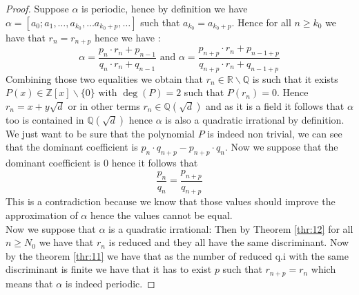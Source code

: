 \documentclass[a4paper,11pt,american]{article}
\newcommand{\Q}{\mathbb{Q}}
\newcommand{\R}{\mathbb{R}}
\newcommand{\Z}{\mathbb{Z}}
\theoremstyle{plain}
\theoremstyle{definition}
\begin{document}
     \begin{proof}
         Suppose $\alpha$ is periodic, hence by definition we have $\alpha=[a_0;a_1,\dots, a_{k_0},\dots a_{k_0+p},\dots]$ such that $a_{k_0}=a_{k_0+p}$. Hence for all $n\geq k_0$ we have that $r_n=r_{n+p}$ hence we have :
         \begin{equation*}
             \alpha=\frac{p_n\cdot r_n+p_{n-1}}{q_n\cdot r_n+q_{n-1}} \text{ and } \alpha =\frac{p_{n+p}\cdot r_n+p_{n-1+p}}{q_{n+p}\cdot r_n+q_{n-1+p}} 
         \end{equation*}
         Combining those two equalities we obtain that $r_n\in\R\backslash\Q$ is such that it exists $P(x)\in\Z[x]\backslash\{0\}$ with $\deg(P)=2$ such that $P(r_n)=0$. Hence $r_n=x+y\sqrt{d}$ or in other terms $r_n\in\Q(\sqrt{d})$ and as it is a field it follows that $\alpha$ too is contained in $\Q(\sqrt{d})$ hence $\alpha$ is also a quadratic irrational by definition.
         We just want to be sure that the polynomial $P$ is indeed non trivial, we can see that the dominant coefficient is $p_{n}\cdot q_{n+p}-p_{n+p}\cdot q_{n}$. Now we suppose that the dominant coefficient is 0 hence it follows that $$\frac{p_n}{q_n}=\frac{p_{n+p}}{q_{n+p}}$$
         This is a contradiction because we know that those values should improve the approximation of $\alpha$ hence the values cannot be equal.\\
         Now we suppose that $\alpha$ is a quadratic irrational: Then by Theorem \eqref{thr:12} for all $n\geq N_0$ we have that $r_n$ is reduced and they all have the same discriminant. Now by the theorem \eqref{thr:11} we have that as the number of reduced q.i with the same discriminant is finite we have that it has to exist $p$ such that $r_{n+p}=r_n$ which means that $\alpha$ is indeed periodic.
     \end{proof}
 

\end{document}
